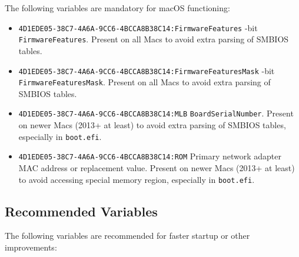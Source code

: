 \documentclass[]{article}
\providecommand{\tightlist}{%
  \setlength{\itemsep}{0pt}\setlength{\parskip}{0pt}}
\begin{document}
The following variables are mandatory for macOS functioning:

\begin{itemize}
\tightlist
\item
  \texttt{4D1EDE05-38C7-4A6A-9CC6-4BCCA8B38C14:FirmwareFeatures}
  -bit \texttt{FirmwareFeatures}. Present on all Macs to avoid extra parsing of SMBIOS tables.
\item
  \texttt{4D1EDE05-38C7-4A6A-9CC6-4BCCA8B38C14:FirmwareFeaturesMask}
  -bit \texttt{FirmwareFeaturesMask}. Present on all Macs to avoid extra parsing
  of SMBIOS tables.
\item
  \texttt{4D1EDE05-38C7-4A6A-9CC6-4BCCA8B38C14:MLB}
  \break
  \texttt{BoardSerialNumber}. Present on newer Macs (2013+ at least) to avoid extra parsing
  of SMBIOS tables, especially in \texttt{boot.efi}.
\item
  \texttt{4D1EDE05-38C7-4A6A-9CC6-4BCCA8B38C14:ROM}
  \break
  Primary network adapter MAC address or replacement value. Present on newer Macs
  (2013+ at least) to avoid accessing special memory region, especially in \texttt{boot.efi}.
\end{itemize}

\subsection{Recommended Variables}\label{nvramvarsrec}

The following variables are recommended for faster startup or other
improvements:
\end{document}
